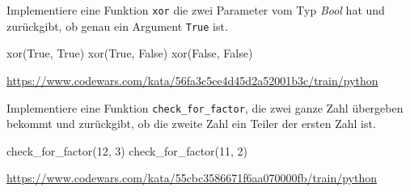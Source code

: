 \documentclass[class=scrartcl, crop=false]{standalone}
\begin{document}
\begin{aufgabe} \noindent
Implementiere eine Funktion \texttt{xor} die  zwei Parameter vom Typ \emph{Bool} hat und zurückgibt, ob genau ein Argument \texttt{True} ist.

\begin{pyconsole}
xor(True, True)
xor(True, False)
xor(False, False)
\end{pyconsole}

\noindent\url{https://www.codewars.com/kata/56fa3c5ce4d45d2a52001b3c/train/python}\\
\end{aufgabe}



\begin{aufgabe} \noindent
Implementiere eine Funktion \texttt{check_for_factor}, die zwei ganze Zahl übergeben bekommt und zurückgibt, ob die zweite Zahl ein Teiler der ersten Zahl ist.
	
\begin{pyconsole}
check_for_factor(12, 3)
check_for_factor(11, 2)
\end{pyconsole}
	
\noindent\url{https://www.codewars.com/kata/55cbc3586671f6aa070000fb/train/python}	
\end{aufgabe}
\end{document}
